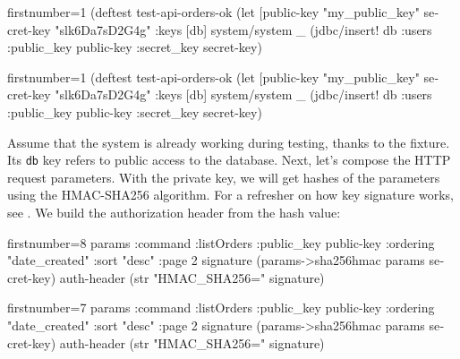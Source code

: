 \ifnarrow

\begin{english}
  \begin{clojure/lines*}{firstnumber=1}
(deftest test-api-orders-ok
  (let [public-key "my_public_key"
        secret-key "slk6Da7sD2G4g"
        {:keys [db]} system/system
        _ (jdbc/insert! db :users
            {:public_key public-key
             :secret_key secret-key})
  \end{clojure/lines*}
\end{english}

\else

\begin{english}
  \begin{clojure/lines*}{firstnumber=1}
(deftest test-api-orders-ok
  (let [public-key "my_public_key"
        secret-key "slk6Da7sD2G4g"
        {:keys [db]} system/system
        _ (jdbc/insert! db :users {:public_key public-key
                                   :secret_key secret-key})
  \end{clojure/lines*}
\end{english}

\fi

Assume that the system is already working during testing, thanks to the fixture. Its \verb|db| key refers to public access to the database. Next, let's compose the HTTP request parameters. With the private key, we will get hashes of the parameters using the HMAC-SHA256 algorithm. For a refresher on how key signature works, see . We build the authorization header from the hash value:

\ifnarrow

\begin{english}
  \begin{clojure/lines*}{firstnumber=8}
    params {:command :listOrders
            :public_key public-key
            :ordering "date_created"
            :sort "desc"
            :page 2}
    signature (params->sha256hmac
                params secret-key)
    auth-header (str "HMAC_SHA256="
                  signature)
  \end{clojure/lines*}
\end{english}

\else

\begin{english}
  \begin{clojure/lines*}{firstnumber=7}
        params {:command :listOrders
                :public_key public-key
                :ordering "date_created"
                :sort "desc"
                :page 2}
        signature (params->sha256hmac params secret-key)
        auth-header (str "HMAC_SHA256=" signature)
  \end{clojure/lines*}
\end{english}

